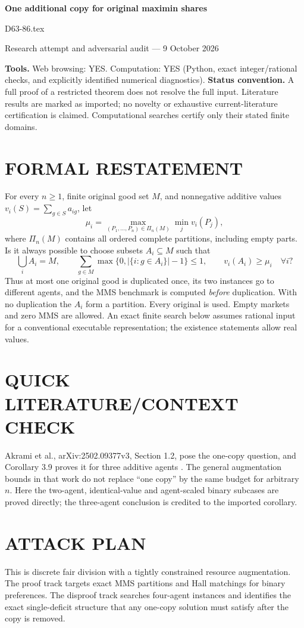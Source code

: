 \documentclass[11pt,a4paper]{article}
\theoremstyle{remark}\newtheorem{remark}[theorem]{Remark}
\begin{document}
\begin{center}
{\LARGE\bfseries One additional copy for original maximin shares}\par\medskip
{\large D63-86.tex}\par
Research attempt and adversarial audit --- 9 October 2026
\end{center}
\label{problem:OP-0195}
\label{game:GT-065}
\textbf{Tools.} Web browsing: YES. Computation: YES (Python, exact integer/rational checks, and explicitly identified numerical diagnostics).
\textbf{Status convention.} A full proof of a restricted theorem does not resolve the full input. Literature results are marked as imported; no novelty or exhaustive current-literature certification is claimed. Computational searches certify only their stated finite domains.

\section{FORMAL RESTATEMENT}
For every $n\ge1$, finite original good set $M$, and nonnegative additive values $v_i(S)=\sum_{g\in S}a_{ig}$, let
\[
\mu_i=\max_{(P_1,\ldots,P_n)\in\Pi_n(M)}\min_jv_i(P_j),
\]
where $\Pi_n(M)$ contains all ordered complete partitions, including empty parts. Is it always possible to choose subsets $A_i\subseteq M$ such that
\[
\bigcup_iA_i=M,\qquad
\sum_{g\in M}\max\{0,|\{i:g\in A_i\}|-1\}\le1,\qquad
v_i(A_i)\ge\mu_i\quad\forall i?
\]
Thus at most one original good is duplicated once, its two instances go to different agents, and the MMS benchmark is computed \emph{before} duplication. With no duplication the $A_i$ form a partition. Every original is used. Empty markets and zero MMS are allowed. An exact finite search below assumes rational input for a conventional executable representation; the existence statements allow real values.

\section{QUICK LITERATURE/CONTEXT CHECK}
Akrami et al., arXiv:2502.09377v3, Section 1.2, pose the one-copy question, and Corollary 3.9 proves it for three additive agents \cite{augmentation}. The general augmentation bounds in that work do not replace ``one copy'' by the same budget for arbitrary $n$. Here the two-agent, identical-value and agent-scaled binary subcases are proved directly; the three-agent conclusion is credited to the imported corollary.

\section{ATTACK PLAN}
This is discrete fair division with a tightly constrained resource augmentation. The proof track targets exact MMS partitions and Hall matchings for binary preferences. The disproof track searches four-agent instances and identifies the exact single-deficit structure that any one-copy solution must satisfy after the copy is removed.
\end{document}

